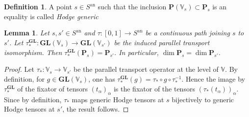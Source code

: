 \documentclass[10pt]{article}
\numberwithin{equation}{subsection}
\theoremstyle{plain}
\newtheorem{lemma}[theorem]{Lemma}
\theoremstyle{definition}
\newtheorem{definition}[theorem]{Definition}
\theoremstyle{remark}
\newcommand{\V}{\mathbb V}
\newcommand{\pp}{\mathbf P}
\newcommand{\an}{\mathrm{an}}
\newcommand{\gl}{\mathbf{GL}}
\begin{document}
\begin{definition}
A point $s \in S^\an$ such that the inclusion $\pp(\V_s) \subset \pp_s$ is an equality is called \textit{Hodge generic}
\end{definition}
\begin{lemma}\label{transmt}
Let $s,s' \in S^\an$ and $\tau : [0,1] \rightarrow S^\an$ be a continuous path joining $s$ to $s'$. Let $\tau_\ast^\gl : \gl(\V_s) \rightarrow \gl(\V_{s'})$ be the induced parallel transport isomorphism. Then $\tau_\ast^\gl(\pp_s) = \pp_{s'}$. In particular, $\dim \pp_s = \dim \pp_{s'}$.
\end{lemma}
\begin{proof}
Let $\tau_\ast : \V_s \rightarrow \V_{s'}$ be the parallel transport operator at the level of $\V$. By definition, for $g \in \gl(\V_s)$, one has $\tau_\ast^\gl(g) = \tau_\ast \circ g \circ \tau_\ast^{-1}$. Hence the image by $\tau_\ast^\gl$ of the fixator of tensors $(t_\alpha)_\alpha$ is the fixator of the tensors $(\tau_\ast(t_\alpha))_\alpha$. Since by definition, $\tau_\ast$ maps generic Hodge tensors at $s$ bijectively to generic Hodge tensors at $s'$, the result follows. 
\end{proof}
\end{document}
